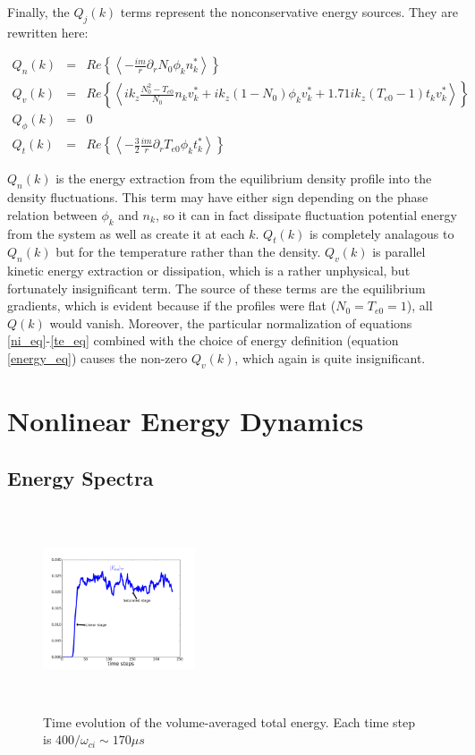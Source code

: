 \documentclass[twocolumn,showpacs,preprintnumbers,amsmath,amssymb]{revtex4}
\def\beqar{\begin{eqnarray}}
\def\eeqar{\end{eqnarray}}
\newcommand{\pdr}{\partial_r}
\begin{document}
Finally, the $Q_j(k)$ terms represent the nonconservative energy sources. They are rewritten here:

\beqar
Q_n(k) & = & Re \left\{ \left< -\frac{i m}{r} \pdr N_0 \phi_k n_k^*  \right> \right\}
\label{Qnk} \\
Q_v(k) & = & Re \left\{ \left<  i k_z \frac{N_0^2 - T_{e0}}{N_0} n_k v_k^* + i k_z (1 - N_0) \phi_k v_k^* + 1.71 i k_z (T_{e0} -1) t_k v_k^*  \right> \right\}
\label{Qvk} \\
Q_\phi(k) & = & 0
\label{Qpk} \\
Q_t(k) & = & Re \left\{ \left< -\frac{3}{2} \frac{i m}{r} \pdr T_{e0} \phi_k t_k^*  \right> \right\}
\label{Qtk}
\eeqar

$Q_n(k)$ is the energy extraction from the equilibrium density profile into the density fluctuations. 
This term may have either sign depending on the phase relation between $\phi_k$ and $n_k$, so it can in fact dissipate fluctuation potential energy from the system as well as create it
at each $k$. $Q_t(k)$ is completely analagous to $Q_n(k)$ but for the temperature rather than the density. 
$Q_v(k)$ is parallel kinetic energy extraction or dissipation, which is a rather unphysical, but fortunately insignificant term.
The source of these terms are the equilibrium gradients, which is evident because if the profiles
were flat ($N_0=T_{e0}=1$), all $Q(k)$ would vanish.
Moreover, the particular normalization of equations \ref{ni_eq}-\ref{te_eq} combined with the choice of energy definition (equation \ref{energy_eq}) causes the non-zero $Q_v(k)$, which again
is quite insignificant.


\section{Nonlinear Energy Dynamics}
\label{nl_en_dynamics_sec}

\subsection{Energy Spectra}

\begin{figure}
\includegraphics[width=0.40\textwidth,height=60mm]{time_evolution}
\hfil
\caption{Time evolution of the volume-averaged total energy. Each time step is $400/\omega_{ci} \sim 170 \mu s$}
\label{time_evolution}
\end{figure}
\end{document}
